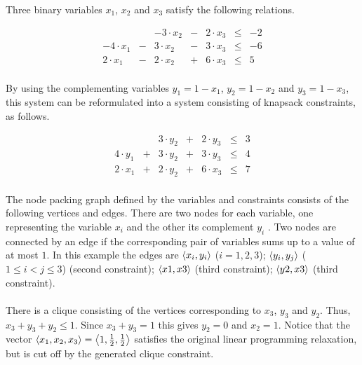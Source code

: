 \begin{example}
Three binary variables $x_1$, $x_2$ and $x_3$ satisfy the following relations.

\begin{equation}
\begin{array}{rcrcrcr}
&&-3\cdot x_2&-&2\cdot x_3&\leq&-2\\
-4\cdot x_1&-&3\cdot x_2&-&3\cdot x_3&\leq&-6\\
2\cdot x_1&-&2\cdot x_2&+&6\cdot x_3&\leq&5
\end{array}
\end{equation}

\paragraph{}
By using the complementing variables $y_1=1-x_1$, $y_2=1-x_2$ and $y_3=1-x_3$, this system can be reformulated into a system consisting of knapsack constraints, as follows.

\begin{equation}
\begin{array}{rcrcrcr}
&&3\cdot y_2&+&2\cdot y_3&\leq&3\\
4\cdot y_1&+&3\cdot y_2&+&3\cdot y_3&\leq&4\\
2\cdot x_1&+&2\cdot y_2&+&6\cdot x_3&\leq&7
\end{array}
\end{equation}

\paragraph{}
The node packing graph defined by the variables and constraints consists of the following vertices and edges. There are two nodes for each variable, one representing the variable $x_i$ and the other its complement $y_i$ . Two nodes are connected by an edge if the corresponding pair of variables sums up to a value of at most $1$. In this example the edges are $\left\langle x_i,y_i \right\rangle$ ($i=1,2,3$); $\left\langle y_i,y_j \right\rangle$ ($1\leq i < j \leq 3$) (second constraint); $\left\langle x1,x3 \right\rangle$ (third constraint); $\left\langle y2,x3 \right\rangle$ (third constraint).


\paragraph{}
There is a clique consisting of the vertices corresponding to $x_3$, $y_3$ and $y_2$. Thus, $x_3+y_3+y_2\leq 1$. Since $x_3+y_3=1$ this gives $y_2=0$ and $x_2=1$. Notice that the vector $\left\langle x_1,x_2,x_3 \right\rangle=\left\langle 1,\frac{1}{2},\frac{1}{2} \right\rangle$ satisfies the original linear programming relaxation, but is cut off by the generated clique constraint.
\end{example}

